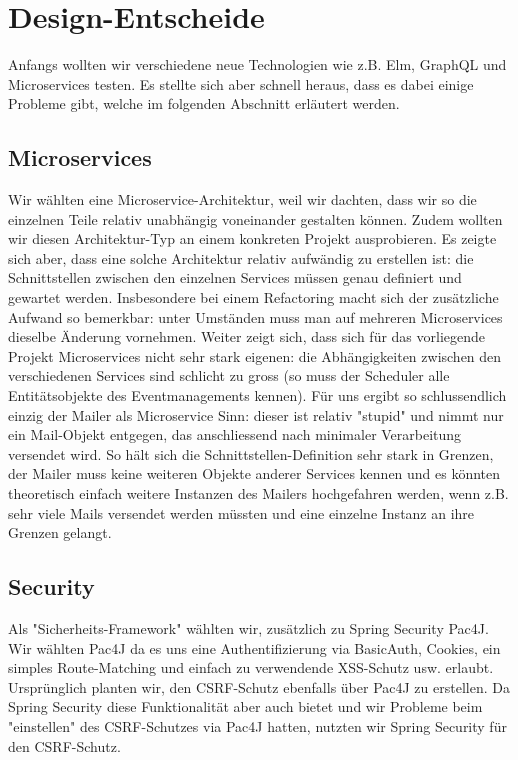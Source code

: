 \documentclass[11pt]{article} %
\begin{document}
\newpage
\section{Design-Entscheide}
Anfangs wollten wir verschiedene neue Technologien wie z.B. Elm, GraphQL und Microservices testen. Es stellte sich aber schnell heraus, dass es dabei einige Probleme gibt, welche im folgenden Abschnitt erläutert werden.

\subsection{Microservices}
Wir wählten eine Microservice-Architektur, weil wir dachten, dass wir so die einzelnen Teile relativ unabhängig voneinander gestalten können. Zudem wollten wir diesen Architektur-Typ an einem konkreten Projekt ausprobieren. Es zeigte sich aber, dass eine solche Architektur relativ aufwändig zu erstellen ist: die Schnittstellen zwischen den einzelnen Services müssen genau definiert und gewartet werden. Insbesondere bei einem Refactoring macht sich der zusätzliche Aufwand so bemerkbar: unter Umständen muss man auf mehreren Microservices dieselbe Änderung vornehmen. Weiter zeigt sich, dass sich für das vorliegende Projekt Microservices nicht sehr stark eigenen: die Abhängigkeiten zwischen den verschiedenen Services sind schlicht zu gross (so muss der Scheduler alle Entitätsobjekte des Eventmanagements kennen). Für uns ergibt so schlussendlich einzig der Mailer als Microservice Sinn: dieser ist relativ "stupid" und nimmt nur ein Mail-Objekt entgegen, das anschliessend nach minimaler Verarbeitung versendet wird. So hält sich die Schnittstellen-Definition sehr stark in Grenzen, der Mailer muss keine weiteren Objekte anderer Services kennen und es könnten theoretisch einfach weitere Instanzen des Mailers hochgefahren werden, wenn z.B. sehr viele Mails versendet werden müssten und eine einzelne Instanz an ihre Grenzen gelangt.

\subsection{Security}
Als "Sicherheits-Framework" wählten wir, zusätzlich zu Spring Security Pac4J. Wir wählten Pac4J da es uns eine Authentifizierung via BasicAuth, Cookies, ein simples Route-Matching und einfach zu verwendende XSS-Schutz usw. erlaubt. Ursprünglich planten wir, den CSRF-Schutz ebenfalls über Pac4J zu erstellen. Da Spring Security diese Funktionalität aber auch bietet und wir Probleme beim "einstellen" des CSRF-Schutzes via Pac4J hatten, nutzten wir Spring Security für den CSRF-Schutz.
\end{document}
